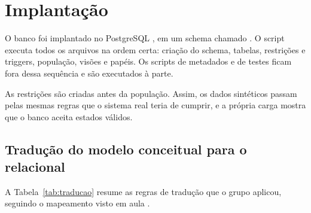 \section{Implantação}
\label{sec:implantacao}

O banco foi implantado no PostgreSQL \cite{postgresql}, em um schema chamado . O script  executa todos os arquivos na ordem certa: criação do schema, tabelas, restrições e triggers, população, visões e papéis. Os scripts de metadados e de testes ficam fora dessa sequência e são executados à parte.

As restrições são criadas antes da população. Assim, os dados sintéticos passam pelas mesmas regras que o sistema real teria de cumprir, e a própria carga mostra que o banco aceita estados válidos.

\subsection{Tradução do modelo conceitual para o relacional}
\label{sec:traducao}

A Tabela~\ref{tab:traducao} resume as regras de tradução que o grupo aplicou, seguindo o mapeamento visto em aula \cite{heuser2009,elmasri2018}.

